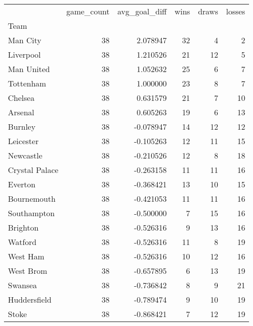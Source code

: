 \begin{tabular}{lrrrrr}
\toprule
{} &  game\_count &  avg\_goal\_diff &  wins &  draws &  losses \\
Team           &             &                &       &        &         \\
\midrule
Man City       &          38 &       2.078947 &    32 &      4 &       2 \\
Liverpool      &          38 &       1.210526 &    21 &     12 &       5 \\
Man United     &          38 &       1.052632 &    25 &      6 &       7 \\
Tottenham      &          38 &       1.000000 &    23 &      8 &       7 \\
Chelsea        &          38 &       0.631579 &    21 &      7 &      10 \\
Arsenal        &          38 &       0.605263 &    19 &      6 &      13 \\
Burnley        &          38 &      -0.078947 &    14 &     12 &      12 \\
Leicester      &          38 &      -0.105263 &    12 &     11 &      15 \\
Newcastle      &          38 &      -0.210526 &    12 &      8 &      18 \\
Crystal Palace &          38 &      -0.263158 &    11 &     11 &      16 \\
Everton        &          38 &      -0.368421 &    13 &     10 &      15 \\
Bournemouth    &          38 &      -0.421053 &    11 &     11 &      16 \\
Southampton    &          38 &      -0.500000 &     7 &     15 &      16 \\
Brighton       &          38 &      -0.526316 &     9 &     13 &      16 \\
Watford        &          38 &      -0.526316 &    11 &      8 &      19 \\
West Ham       &          38 &      -0.526316 &    10 &     12 &      16 \\
West Brom      &          38 &      -0.657895 &     6 &     13 &      19 \\
Swansea        &          38 &      -0.736842 &     8 &      9 &      21 \\
Huddersfield   &          38 &      -0.789474 &     9 &     10 &      19 \\
Stoke          &          38 &      -0.868421 &     7 &     12 &      19 \\
\bottomrule
\end{tabular}
